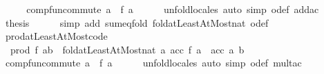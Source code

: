 \begin{isabellebody}
%
\isadelimproof
%
\endisadelimproof
%
\isatagproof
{}\isamarkupfalse%
\ {\isacharminus}{\kern0pt}\isanewline
\ \ \isamarkupfalse%
\ {\isachardoublequoteopen}comp{\isacharunderscore}{\kern0pt}fun{\isacharunderscore}{\kern0pt}commute\ {\isacharparenleft}{\kern0pt}{\isasymlambda}a{\isachardot}{\kern0pt}\ {\isacharparenleft}{\kern0pt}{\isacharplus}{\kern0pt}{\isacharparenright}{\kern0pt}\ {\isacharparenleft}{\kern0pt}f\ a{\isacharparenright}{\kern0pt}{\isacharparenright}{\kern0pt}{\isachardoublequoteclose}\isanewline
\ \ \ \ \isamarkupfalse%
\ unfold{\isacharunderscore}{\kern0pt}locales\ {\isacharparenleft}{\kern0pt}auto\ simp{\isacharcolon}{\kern0pt}\ o{\isacharunderscore}{\kern0pt}def\ add{\isacharunderscore}{\kern0pt}ac{\isacharparenright}{\kern0pt}\isanewline
\ \ \isamarkupfalse%
\ {\isacharquery}{\kern0pt}thesis\isanewline
\ \ \ \ \isamarkupfalse%
\ {\isacharparenleft}{\kern0pt}simp\ add{\isacharcolon}{\kern0pt}\ sum{\isachardot}{\kern0pt}eq{\isacharunderscore}{\kern0pt}fold\ fold{\isacharunderscore}{\kern0pt}atLeastAtMost{\isacharunderscore}{\kern0pt}nat\ o{\isacharunderscore}{\kern0pt}def{\isacharparenright}{\kern0pt}\isanewline
{}\isamarkupfalse%
%
\endisatagproof
{\isafoldproof}%
%
\isadelimproof
\isanewline
%
\endisadelimproof
\isanewline
{}\isamarkupfalse%
\ prod{\isacharunderscore}{\kern0pt}atLeastAtMost{\isacharunderscore}{\kern0pt}code{\isacharcolon}{\kern0pt}\isanewline
\ \ {\isachardoublequoteopen}prod\ f\ {\isacharbraceleft}{\kern0pt}a{\isachardot}{\kern0pt}{\isachardot}{\kern0pt}b{\isacharbraceright}{\kern0pt}\ {\isacharequal}{\kern0pt}\ fold{\isacharunderscore}{\kern0pt}atLeastAtMost{\isacharunderscore}{\kern0pt}nat\ {\isacharparenleft}{\kern0pt}{\isasymlambda}a\ acc{\isachardot}{\kern0pt}\ f\ a\ {\isacharasterisk}{\kern0pt}\ acc{\isacharparenright}{\kern0pt}\ a\ b\ {}{\isachardoublequoteclose}\isanewline
%
\isadelimproof
%
\endisadelimproof
%
\isatagproof
{}\isamarkupfalse%
\ {\isacharminus}{\kern0pt}\isanewline
\ \ \isamarkupfalse%
\ {\isachardoublequoteopen}comp{\isacharunderscore}{\kern0pt}fun{\isacharunderscore}{\kern0pt}commute\ {\isacharparenleft}{\kern0pt}{\isasymlambda}a{\isachardot}{\kern0pt}\ {\isacharparenleft}{\kern0pt}{\isacharasterisk}{\kern0pt}{\isacharparenright}{\kern0pt}\ {\isacharparenleft}{\kern0pt}f\ a{\isacharparenright}{\kern0pt}{\isacharparenright}{\kern0pt}{\isachardoublequoteclose}\isanewline
\ \ \ \ \isamarkupfalse%
\ unfold{\isacharunderscore}{\kern0pt}locales\ {\isacharparenleft}{\kern0pt}auto\ simp{\isacharcolon}{\kern0pt}\ o{\isacharunderscore}{\kern0pt}def\ mult{\isacharunderscore}{\kern0pt}ac{\isacharparenright}{\kern0pt}\isanewline

\end{isabellebody}
